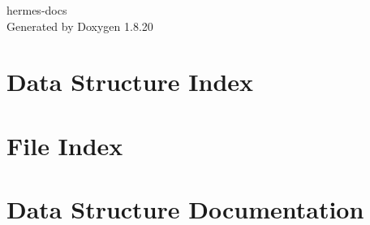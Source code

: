 \let\mypdfximage\pdfximage\def\pdfximage{\immediate\mypdfximage}\documentclass[twoside]{book}
\newcommand{\+}{\discretionary{\mbox{\scriptsize$\hookleftarrow$}}{}{}}
\newcommand{\clearemptydoublepage}{%
  \newpage{\pagestyle{empty}\cleardoublepage}%
}
\begin{document}
\hypersetup{pageanchor=false,
             bookmarksnumbered=true,
             pdfencoding=unicode
            }
\begin{titlepage}
\vspace*{7cm}
\begin{center}%
{\Large hermes-\/docs }\\
\vspace*{1cm}
{\large Generated by Doxygen 1.8.20}\\
\end{center}
\end{titlepage}
\clearemptydoublepage
{}
\tableofcontents
\clearemptydoublepage
{}
\hypersetup{pageanchor=true}

\chapter{Data Structure Index}

\chapter{File Index}

\chapter{Data Structure Documentation}















































\end{document}
